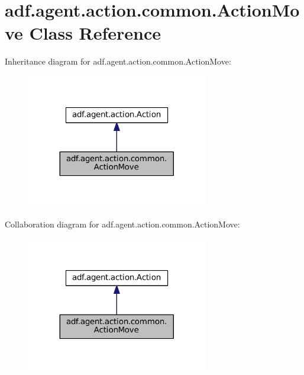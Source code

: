 \hypertarget{classadf_1_1agent_1_1action_1_1common_1_1ActionMove}{}\section{adf.\+agent.\+action.\+common.\+Action\+Move Class Reference}
\label{classadf_1_1agent_1_1action_1_1common_1_1ActionMove}


Inheritance diagram for adf.\+agent.\+action.\+common.\+Action\+Move\+:
\nopagebreak
\begin{figure}[H]
\begin{center}
\leavevmode
\includegraphics[width=224pt]{classadf_1_1agent_1_1action_1_1common_1_1ActionMove__inherit__graph}
\end{center}
\end{figure}


Collaboration diagram for adf.\+agent.\+action.\+common.\+Action\+Move\+:
\nopagebreak
\begin{figure}[H]
\begin{center}
\leavevmode
\includegraphics[width=224pt]{classadf_1_1agent_1_1action_1_1common_1_1ActionMove__coll__graph}
\end{center}
\end{figure}
